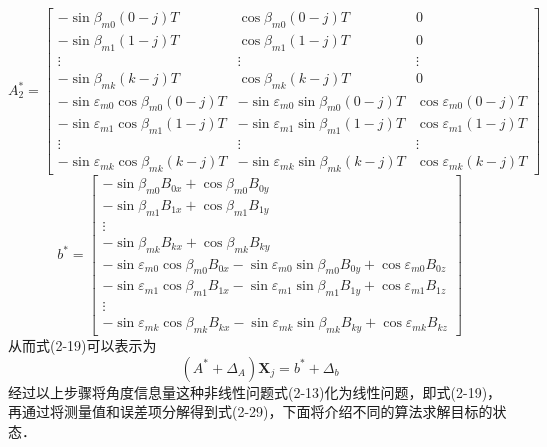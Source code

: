\begin{equation}
	A_{2}^* = \left[\begin{array}{ccc}
		-\sin\beta_{m0}(0-j)T & \cos\beta_{m0}(0-j)T & 0 \\
		-\sin\beta_{m1}(1-j)T & \cos\beta_{m1}(1-j)T & 0 \\
		\vdots & \vdots & \vdots \\
		-\sin\beta_{mk}(k-j)T & \cos\beta_{mk}(k-j)T & 0 \\ \hline
		-\sin\varepsilon_{m0}\cos\beta_{m0}(0-j)T & -\sin\varepsilon_{m0}\sin\beta_{m0}(0-j)T & \cos\varepsilon_{m0}(0-j)T \\
		-\sin\varepsilon_{m1}\cos\beta_{m1}(1-j)T & -\sin\varepsilon_{m1}\sin\beta_{m1}(1-j)T & \cos\varepsilon_{m1}(1-j)T \\
		\vdots & \vdots & \vdots \\
		-\sin\varepsilon_{mk}\cos\beta_{mk}(k-j)T & -\sin\varepsilon_{mk}\sin\beta_{mk}(k-j)T & \cos\varepsilon_{mk}(k-j)T
	\end{array}\right]
\end{equation}
\begin{equation}
	b^* = \left[\begin{array}{c}
		-\sin\beta_{m0}B_{0x} + \cos\beta_{m0}B_{0y} \\
		-\sin\beta_{m1}B_{1x} + \cos\beta_{m1}B_{1y} \\
		\vdots \\
		-\sin\beta_{mk}B_{kx} + \cos\beta_{mk}B_{ky} \\ \hline
		-\sin\varepsilon_{m0}\cos\beta_{m0}B_{0x}-\sin\varepsilon_{m0}\sin\beta_{m0}B_{0y} + \cos\varepsilon_{m0}B_{0z} \\
		-\sin\varepsilon_{m1}\cos\beta_{m1}B_{1x}-\sin\varepsilon_{m1}\sin\beta_{m1}B_{1y} + \cos\varepsilon_{m1}B_{1z} \\
		\vdots \\
		-\sin\varepsilon_{mk}\cos\beta_{mk}B_{kx}-\sin\varepsilon_{mk}\sin\beta_{mk}B_{ky} + \cos\varepsilon_{mk}B_{kz} 
	\end{array}
	\right]
\end{equation}
从而式(2-19)可以表示为
\begin{equation}
	(A^* + \Delta_A)\bm{X}_j = b^* + \Delta_b
\end{equation}
经过以上步骤将角度信息量这种非线性问题式(2-13)化为线性问题，即式(2-19)，再通过将测量值和误差项分解得到式(2-29)，下面将介绍不同的算法求解目标的状态．